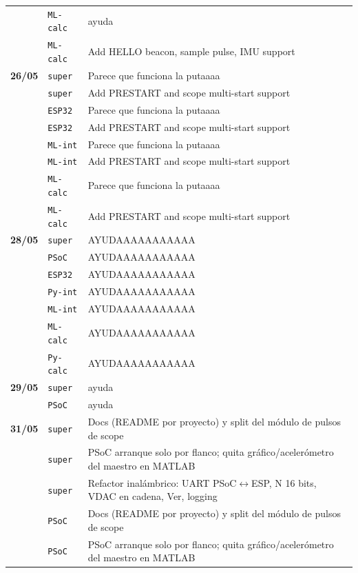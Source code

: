\begin{longtable}{@{}p{1.7cm} p{1.5cm} p{12.2cm}@{}}
 & \texttt{\scriptsize ML-calc} & ayuda \\
 & \texttt{\scriptsize ML-calc} & Add HELLO beacon, sample pulse, IMU support \\
\textbf{26/05} & \texttt{\scriptsize super} & Parece que funciona la putaaaa \\
 & \texttt{\scriptsize super} & Add PRESTART and scope multi-start support \\
 & \texttt{\scriptsize ESP32} & Parece que funciona la putaaaa \\
 & \texttt{\scriptsize ESP32} & Add PRESTART and scope multi-start support \\
 & \texttt{\scriptsize ML-int} & Parece que funciona la putaaaa \\
 & \texttt{\scriptsize ML-int} & Add PRESTART and scope multi-start support \\
 & \texttt{\scriptsize ML-calc} & Parece que funciona la putaaaa \\
 & \texttt{\scriptsize ML-calc} & Add PRESTART and scope multi-start support \\
\textbf{28/05} & \texttt{\scriptsize super} & AYUDAAAAAAAAAAA \\
 & \texttt{\scriptsize PSoC} & AYUDAAAAAAAAAAA \\
 & \texttt{\scriptsize ESP32} & AYUDAAAAAAAAAAA \\
 & \texttt{\scriptsize Py-int} & AYUDAAAAAAAAAAA \\
 & \texttt{\scriptsize ML-int} & AYUDAAAAAAAAAAA \\
 & \texttt{\scriptsize ML-calc} & AYUDAAAAAAAAAAA \\
 & \texttt{\scriptsize Py-calc} & AYUDAAAAAAAAAAA \\
\textbf{29/05} & \texttt{\scriptsize super} & ayuda \\
 & \texttt{\scriptsize PSoC} & ayuda \\
\textbf{31/05} & \texttt{\scriptsize super} & Docs (README por proyecto) y split del módulo de pulsos de scope \\
 & \texttt{\scriptsize super} & PSoC arranque solo por flanco; quita gráfico/acelerómetro del maestro en MATLAB \\
 & \texttt{\scriptsize super} & Refactor inalámbrico: UART PSoC$\leftrightarrow$ESP, N 16 bits, VDAC en cadena, Ver, logging \\
 & \texttt{\scriptsize PSoC} & Docs (README por proyecto) y split del módulo de pulsos de scope \\
 & \texttt{\scriptsize PSoC} & PSoC arranque solo por flanco; quita gráfico/acelerómetro del maestro en MATLAB \\

\end{longtable}
